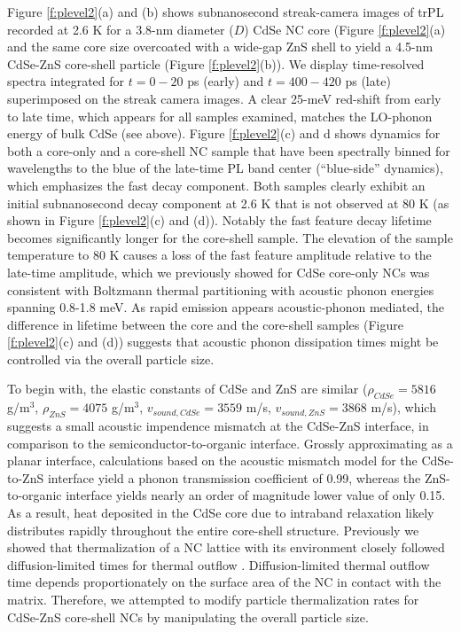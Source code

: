Figure \ref{f:plevel2}(a) and (b) shows subnanosecond streak-camera images of trPL recorded at 2.6 K for a 3.8-nm diameter ($D$) CdSe NC core (Figure \ref{f:plevel2}(a) and the same core size overcoated with a wide-gap ZnS shell to yield a 4.5-nm CdSe-ZnS core-shell particle (Figure \ref{f:plevel2}(b)). We display time-resolved spectra integrated for $t = 0-20$ ps (early) and $t = 400-420$ ps (late) superimposed on the streak camera images. A clear 25-meV red-shift from early to late time, which appears for all samples examined, matches the LO-phonon energy of bulk CdSe (see above). Figure \ref{f:plevel2}(c) and d shows dynamics for both a core-only and a core-shell NC sample that have been spectrally binned for wavelengths to the blue of the late-time PL band center (“blue-side” dynamics), which emphasizes the fast decay component. Both samples clearly exhibit an initial subnanosecond decay component at 2.6 K that is not observed at 80 K (as shown in Figure \ref{f:plevel2}(c) and (d)). Notably the fast feature decay lifetime becomes significantly longer for the core-shell sample. The elevation of the sample temperature to 80 K causes a loss of the fast feature amplitude relative to the late-time amplitude, which we previously showed for CdSe core-only NCs was consistent with Boltzmann thermal partitioning \cite{PhysRevLett.107.177403} with acoustic phonon energies spanning 0.8-1.8 meV. As rapid emission appears acoustic-phonon mediated, the difference in lifetime between the core and the core-shell samples (Figure \ref{f:plevel2}(c) and (d)) suggests that acoustic phonon dissipation times might be controlled via the overall particle size. \par

To begin with, the elastic constants of CdSe and ZnS are similar ($\rho_{CdSe} = 5816$ g/m$^3$, $\rho_{ZnS} = 4075$ g/m$^3$, $v_{sound, CdSe} = 3559$ m/s, $v_{sound, ZnS} = 3868$ m/s), which suggests a small acoustic impendence mismatch at the CdSe-ZnS interface, in comparison to the semiconductor-to-organic interface. Grossly approximating as a planar interface, calculations based on the acoustic mismatch model for the CdSe-to-ZnS interface yield a phonon transmission coefficient of 0.99, whereas the ZnS-to-organic interface yields nearly an order of magnitude lower value of only 0.15. As a result, heat deposited in the CdSe core due to intraband relaxation likely distributes rapidly throughout the entire core-shell structure. Previously we showed that thermalization of a NC lattice with its environment closely followed diffusion-limited times for thermal outflow \cite{PhysRevLett.107.177403}. Diffusion-limited thermal outflow time depends proportionately on the surface area of the NC in contact with the matrix. Therefore, we attempted to modify particle thermalization rates for CdSe-ZnS core-shell NCs by manipulating the overall particle size. \par  

